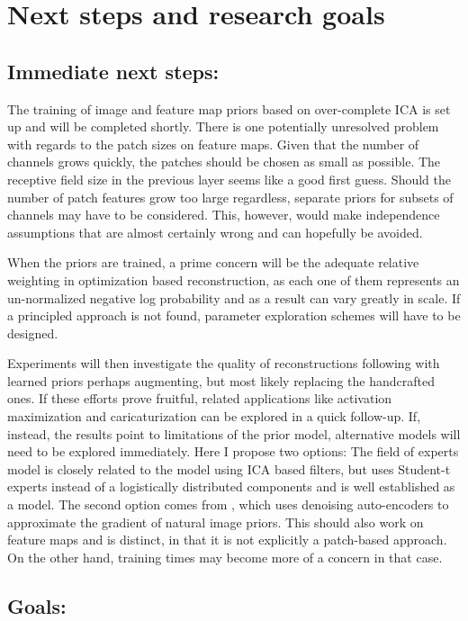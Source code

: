 \documentclass{article}
\begin{document}
\FloatBarrier
\section{Next steps and research goals}

\subsection{Immediate next steps:}

The training of image and feature map priors based on over-complete ICA is set up and will be completed shortly. There is one potentially unresolved problem with regards to the patch sizes on feature maps. Given that the number of channels grows quickly, the patches should be chosen as small as possible. The receptive field size in the previous layer seems like a good first guess. Should the number of patch features grow too large regardless, separate priors for subsets of channels may have to be considered. This, however, would make independence assumptions that are almost certainly wrong and can hopefully be avoided. 

When the priors are trained, a prime concern will be the adequate relative weighting in optimization based reconstruction, as each one of them represents an un-normalized negative log probability and as a result can vary greatly in scale. If a principled approach is not found, parameter exploration schemes will have to be designed.

Experiments will then investigate the quality of reconstructions following \cite{mv16} with learned priors perhaps augmenting, but most likely replacing the handcrafted ones.
If these efforts prove fruitful, related applications like activation maximization and caricaturization \cite{mv16} can be explored in a quick follow-up. If, instead, the results point to limitations of the prior model, alternative models will need to be explored immediately. Here I propose two options: The field of experts model is closely related to the model using ICA based filters, but uses Student-t experts instead of a logistically distributed components and is well established as a model. The second option comes from \cite{plugnplay}, which uses denoising auto-encoders to approximate the gradient of natural image priors. This should also work on feature maps and is distinct, in that it is not explicitly a patch-based approach. On the other hand, training times may become more of a concern in that case.

\subsection{Goals:}
\end{document}
